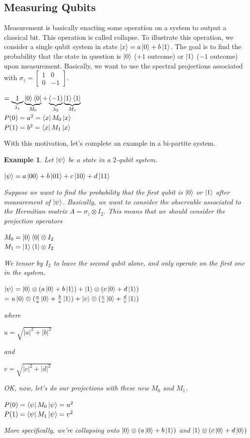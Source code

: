 \documentclass[12pt]{article}
\theoremstyle{plain}
\theoremstyle{nonumberplain}
\theoremstyle{plain}
\newtheorem{example}[lemma]{Example}
\theoremstyle{nonumberplain}
\newcommand\1{{\bf 1}}
\newcommand{\bmat}[1]{\begin{bmatrix*} #1 \end{bmatrix*}} %
\newcommand{\proj}[2]{\ket{#1}\bra{#2}}
\newcommand{\<}{\left\langle}
\renewcommand{\>}{\right\rangle}
\newcommand{\abs}[1]{\left\lvert #1 \right\rvert} %
\begin{document}
\subsection{Measuring Qubits}
Measurement is basically enacting some operation on a system to output a classical bit. This operation is called collapse. To illustrate this operation, we consider a single qubit system in state $\ket{x}=a\ket{0}+b\ket{1}$. The goal is to find the probability that the state in question is $\ket{0}$ ($+1$ outcome) or $\ket{1}$ ($-1$ outcome) upon measurement. Basically, we want to use the spectral projections associated with $\sigma_z=\bmat{1 & 0 \\ 0 & -1}$.
\begin{center}
$=\underbrace{1}_{\lambda_1}\underbrace{\ket{0}\bra{0}}_{M_0}+\underbrace{(-1)}_{\lambda_2}\underbrace{\proj{1}{1}}_{M_1}$\\
$P(0)=a^2=\bra{x}M_0\ket{x}$\\
$P(1)=b^2=\bra{x}M_1\ket{x}$
\end{center}
With this motivation, let's complete an example in a bi-partite system.
\begin{example}
Let $\ket{\psi}$ be a state in a $2$-qubit system.
\begin{center}
$\ket{\psi}=a\ket{00}+b\ket{01}+c\ket{10}+d\ket{11}$
\end{center} 
Suppose we want to find the probability that the first qubit is $\ket{0}$ or $\ket{1}$ after measurement of $\ket{\psi}$. Basically, we want to consider the observable associated to the Hermitian matrix $A=\sigma_z\otimes I_2$. This means that we should consider the projection operators
\begin{center}
$M_0=\proj{0}{0}\otimes I_2$\\
$M_1=\proj{1}{1}\otimes I_2$
\end{center}
We tensor by $I_2$ to leave the second qubit alone, and only operate on the first one in the system.
\begin{center}
$\ket{\psi}=\ket{0}\otimes (a\ket{0}+b\ket{1})+\ket{1}\otimes (c\ket{0}+d\ket{1})$\\
$=u\ket{0}\otimes (\frac{a}{u}\ket{0}+\frac{b}{u}\ket{1})+\ket{v}\otimes (\frac{c}{v}\ket{0}+\frac{d}{v}\ket{1})$
\end{center}
where
\begin{center}
$u=\sqrt{\abs{a}^2+\abs{b}^2}$
\end{center}
and
\begin{center}
$v=\sqrt{\abs{c}^2+\abs{d}^2}$
\end{center}
OK, now, let's do our projections with these new $M_0$ and $M_1$.
\begin{center}
$P(0)=\bra{\psi}M_0\ket{\psi}=u^2$\\
$P(1)=\bra{\psi}M_1\ket{\psi}=v^2$
\end{center}
More specifically, we're collapsing onto $\ket{0}\otimes (a\ket{0}+b\ket{1})$ and $\ket{1}\otimes (c\ket{0}+d\ket{0})$
\end{example}
\end{document}
